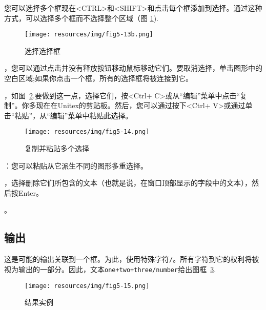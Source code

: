 \bigskip
\noindent 您可以选择多个框现在<CTRL>和<SHIFT>和点击每个框添加到选择。通过这种方式，可以选择多个框而不选择整个区域（图 \ref{multi-selection2}).

\begin{figure}[!ht]
\begin{center}
\texttt{[image: resources/img/fig5-13b.png]}
\caption{选择选择框\label{multi-selection2}}
\end{center}
\end{figure}

\bigskip
{}，您可以通过点击并没有释放按钮移动鼠标移动它们。要取消选择，单击图形中的空白区域;如果你点击一个框，所有的选择框将被连接到它。

\bigskip
{}
，如图~\ref{copy-paste-multi-selection}.要做到这一点，选择它们，按<Ctrl+ C>或从“编辑”菜单中点击“复制”。你多现在在Unitex的剪贴板。然后，您可以通过按下<Ctrl+ V>或通过单击“粘贴”，从“编辑”菜单中粘贴此选择。

\begin{figure}[!h]
\begin{center}
\texttt{[image: resources/img/fig5-14.png]}
\caption{复制并粘贴多个选择\label{copy-paste-multi-selection}}
\end{center}
\end{figure}

\bigskip
{}：您可以粘贴从它派生不同的图形多重选择。

\bigskip
{}
，选择删除它们所包含的文本（也就是说，在窗口顶部显示的字段中的文本），然后按Enter。

\bigskip
{}。

\subsection{输出}
\label{Transducers}\index{\verb+/+}
这是可能的输出关联到一个框。为此，使用特殊字符\verb+/+。所有字符到它的权利将被视为输出的一部分。因此，文本\verb$one+two+three/number$给出图框~\ref{fig-exemple-transduction}.

\begin{figure}[h]
\begin{center}
\texttt{[image: resources/img/fig5-15.png]}
\caption{结果实例\label{fig-exemple-transduction}}
\end{center}
\end{figure}

